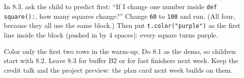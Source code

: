 \begin{stretchchallenge}
In 8.3, ask the child to predict first: \enquote{If I change one number inside \texttt{def square():}, how many squares change?} Change \texttt{60} to \texttt{100} and run. (All four, because they all use the same block.) Then put \texttt{t.color("purple")} as the first line inside the block (pushed in by 4 spaces): every square turns purple.
\end{stretchchallenge}

\begin{teachernote}
Color only the first two rows in the warm-up. Do 8.1 as the demo, so children start with 8.2. Leave 8.3 for buffer B2 or for fast finishers next week. Keep the credit talk and the project preview: the plan card next week builds on them.
\end{teachernote}
